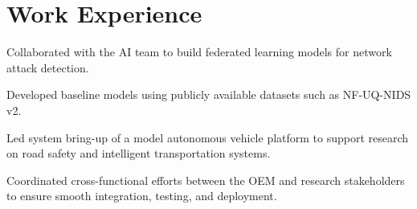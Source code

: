 \documentclass[]{resume-template}
\begin{document}
\begin{minipage}[t]{0.66\textwidth}

  \section{Work Experience}\label{sec:Work Experience}
  \label{subsec:protectionshield}
  \vspace{\topsep}
  \begin{tightemize}
  \item Collaborated with the AI team to build federated learning
    models for network attack detection.
  \item Developed baseline models using publicly available datasets
    such as NF-UQ-NIDS v2.
  \end{tightemize}
  \begin{tightemize}
  \item Led system bring-up
    of a model autonomous vehicle platform to support research on road safety
    and intelligent transportation systems.
  \item Coordinated cross-functional efforts between the OEM and research
    stakeholders to ensure smooth integration, testing, and deployment.
  \end{tightemize}


\end{minipage}
\end{document}
